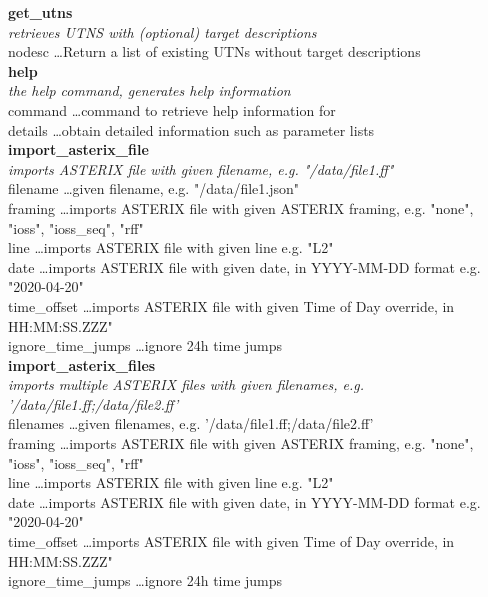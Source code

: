 \textbf{get\_utns} \\
\textit{retrieves UTNS with (optional) target descriptions} \\
nodesc \dots Return a list of existing UTNs without target descriptions \\

\textbf{help} \\
\textit{the help command, generates help information} \\
command \dots command to retrieve help information for \\
details	\dots obtain detailed information such as parameter lists \\

\textbf{import\_asterix\_file} \\
\textit{imports ASTERIX file with given filename, e.g. "/data/file1.ff"} \\
filename \dots given filename, e.g. "/data/file1.json" \\
framing \dots imports ASTERIX file with given  ASTERIX framing, e.g. "none", "ioss", "ioss\_seq", "rff" \\
line \dots imports ASTERIX file with given line e.g. "L2" \\
date \dots imports ASTERIX file with given date, in YYYY-MM-DD format e.g. "2020-04-20" \\
time\_offset \dots imports ASTERIX file with given Time of Day override, in HH:MM:SS.ZZZ" \\
ignore\_time\_jumps \dots ignore 24h time jumps \\

\textbf{import\_asterix\_files} \\
\textit{imports multiple ASTERIX files with given filenames, e.g. '/data/file1.ff;/data/file2.ff'} \\
filenames \dots given filenames, e.g. '/data/file1.ff;/data/file2.ff' \\
framing \dots imports ASTERIX file with given  ASTERIX framing, e.g. "none", "ioss", "ioss\_seq", "rff" \\
line \dots imports ASTERIX file with given line e.g. "L2" \\
date \dots imports ASTERIX file with given date, in YYYY-MM-DD format e.g. "2020-04-20" \\
time\_offset \dots imports ASTERIX file with given Time of Day override, in HH:MM:SS.ZZZ" \\
ignore\_time\_jumps \dots ignore 24h time jumps \\

